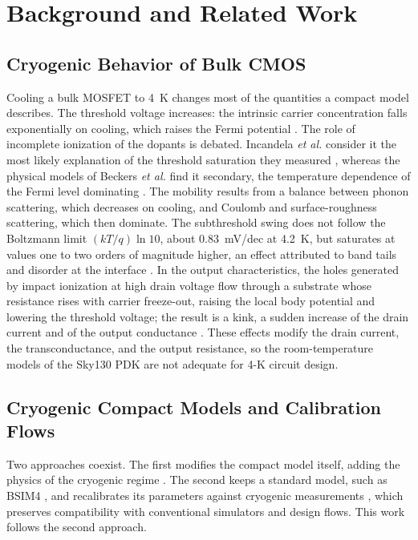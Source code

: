 \documentclass[a4paper,10pt,twoside,twocolumn,final]{JICS_LaTexGuidelines} %
\begin{document}
\section{Background and Related Work}

\subsection{Cryogenic Behavior of Bulk CMOS}

Cooling a bulk MOSFET to 4~K changes most of the quantities a compact model describes. The threshold voltage increases: the intrinsic carrier concentration falls exponentially on cooling, which raises the Fermi potential \cite{b27}. The role of incomplete ionization of the dopants is debated. Incandela \emph{et al.} consider it the most likely explanation of the threshold saturation they measured \cite{b4}, whereas the physical models of Beckers \emph{et al.} find it secondary, the temperature dependence of the Fermi level dominating \cite{b26,b27}. The mobility results from a balance between phonon scattering, which decreases on cooling, and Coulomb and surface-roughness scattering, which then dominate. The subthreshold swing does not follow the Boltzmann limit $(kT/q)\ln 10$, about 0.83~mV/dec at 4.2~K, but saturates at values one to two orders of magnitude higher, an effect attributed to band tails and disorder at the interface \cite{b22,b23}. In the output characteristics, the holes generated by impact ionization at high drain voltage flow through a substrate whose resistance rises with carrier freeze-out, raising the local body potential and lowering the threshold voltage; the result is a kink, a sudden increase of the drain current and of the output conductance \cite{b4}. These effects modify the drain current, the transconductance, and the output resistance, so the room-temperature models of the Sky130 PDK are not adequate for 4-K circuit design.

\subsection{Cryogenic Compact Models and Calibration Flows}

Two approaches coexist. The first modifies the compact model itself, adding the physics of the cryogenic regime \cite{b26,b7}. The second keeps a standard model, such as BSIM4 \cite{b13}, and recalibrates its parameters against cryogenic measurements \cite{b4,b11}, which preserves compatibility with conventional simulators and design flows. This work follows the second approach.
\end{document}
